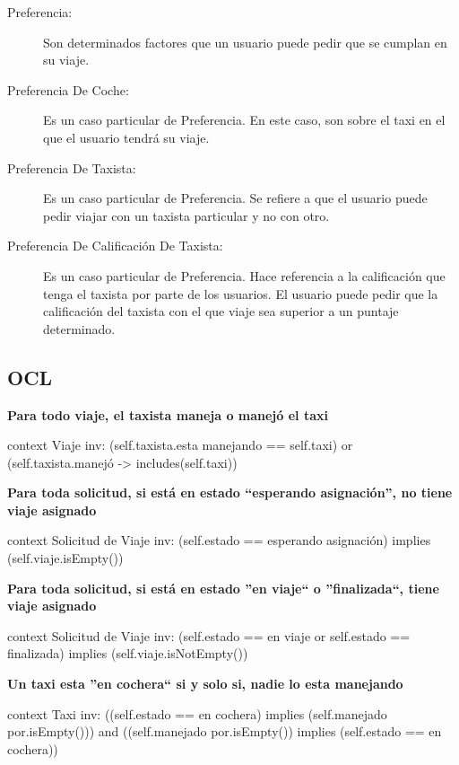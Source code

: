 \documentclass[a4paper, 10pt, twoside]{article}
\newenvironment{ocl}[1]
  {
    \textbf{#1}
    \verbatim
  }{
    \endverbatim
  }
\begin{document}
\begin{description}
  \item[Preferencia:] Son determinados factores que un usuario puede pedir que se cumplan en su viaje.

  \item[Preferencia De Coche:] Es un caso particular de Preferencia. En este caso, son sobre el taxi en el que el usuario tendrá su viaje.

  \item[Preferencia De Taxista:] Es un caso particular de Preferencia. Se refiere a que el usuario puede pedir viajar con un taxista particular y no con otro.

  \item[Preferencia De Calificación De Taxista:] Es un caso particular de Preferencia. Hace referencia a la calificación que tenga el taxista por parte de los usuarios. El usuario puede pedir que la calificación del taxista con el que viaje sea superior a un puntaje determinado.

\end{description}


\subsection{OCL}

\begin{ocl}{Para todo viaje, el taxista maneja o manejó el taxi}
  context Viaje
  inv: (self.taxista.esta manejando == self.taxi) or
       (self.taxista.manejó -> includes(self.taxi)) 
\end{ocl}

\begin{ocl}{Para toda solicitud, si está en estado ``esperando asignación'', no tiene viaje asignado}
  context Solicitud de Viaje
  inv: (self.estado == esperando asignación) implies
       (self.viaje.isEmpty()) 
\end{ocl}

\begin{ocl}{Para toda solicitud, si está en estado ''en viaje`` o ''finalizada``, tiene viaje asignado}
  context Solicitud de Viaje
  inv: (self.estado == en viaje or self.estado == finalizada) implies
       (self.viaje.isNotEmpty()) 
\end{ocl}

\begin{ocl}{Un taxi esta ''en cochera`` si y solo si, nadie lo esta manejando}
  context Taxi
  inv: ((self.estado == en cochera) implies (self.manejado por.isEmpty())) and
       ((self.manejado por.isEmpty()) implies (self.estado == en cochera))
\end{ocl}
 
\end{document}

